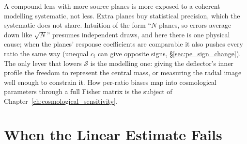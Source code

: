 \begin{keybox}
A compound lens with more source planes is more exposed to a
coherent modelling systematic, not less. Extra planes buy statistical
precision, which the systematic does not share. Intuition of the form
``$N$ planes, so errors average down like $\sqrt N$'' presumes
independent draws, and here there is one physical cause; when the
planes' response coefficients are comparable it also pushes every ratio
the same way (unequal $c_i$ can give opposite signs,
\S\ref{sec:pe_sign_change}). The only
lever that lowers $\mathcal{S}$ is the modelling one: giving the
deflector's inner profile the freedom to represent the central mass, or
measuring the radial image well enough to constrain it. How per-ratio
biases map into cosmological parameters through a full Fisher matrix is
the subject of Chapter~\ref{ch:cosmological_sensitivity}.
\end{keybox}

\section{When the Linear Estimate Fails}
\label{sec:pe_validity}

